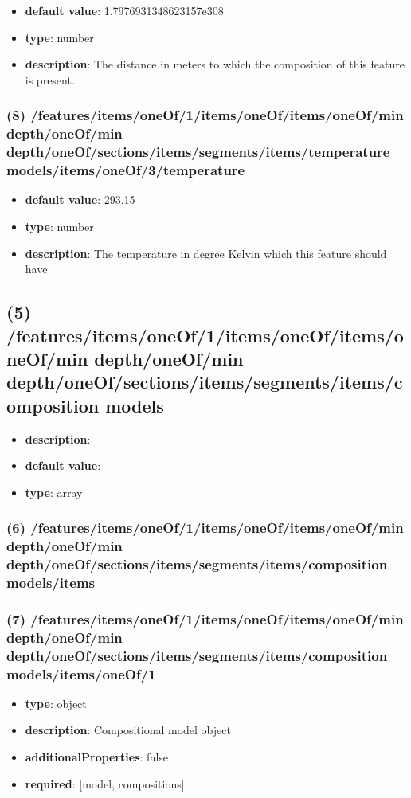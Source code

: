 \begin{itemize}[leftmargin=8em]\item {\bf default value}: 1.7976931348623157e308
\item {\bf type}: number
\item {\bf description}: The distance in meters to which the composition of this feature is present.
\end{itemize}\subsubsection{(8) /features/items/oneOf/1/items/oneOf/items/oneOf/min depth/oneOf/min depth/oneOf/sections/items/segments/items/temperature models/items/oneOf/3/temperature}
\begin{itemize}[leftmargin=8em]\item {\bf default value}: 293.15
\item {\bf type}: number
\item {\bf description}: The temperature in degree Kelvin which this feature should have
\end{itemize}\subsection{(5) /features/items/oneOf/1/items/oneOf/items/oneOf/min depth/oneOf/min depth/oneOf/sections/items/segments/items/composition models}
\begin{itemize}[leftmargin=5em]\item {\bf description}: 
\item {\bf default value}: 
\item {\bf type}: array
\end{itemize}\subsubsection{(6) /features/items/oneOf/1/items/oneOf/items/oneOf/min depth/oneOf/min depth/oneOf/sections/items/segments/items/composition models/items}

\subsubsection{(7) /features/items/oneOf/1/items/oneOf/items/oneOf/min depth/oneOf/min depth/oneOf/sections/items/segments/items/composition models/items/oneOf/1}
\begin{itemize}[leftmargin=7em]\item {\bf type}: object
\item {\bf description}: Compositional model object
\item {\bf additionalProperties}: false
\item {\bf required}: [model, compositions]\end{itemize}
